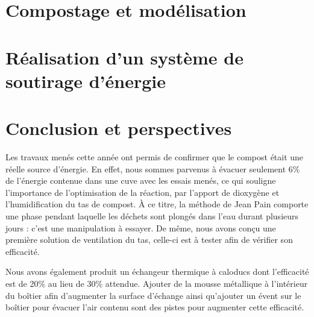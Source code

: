 \documentclass[a4paper,11pt,french]{article}
\begin{document}




\section{Compostage et modélisation}











\section{Réalisation d'un système de soutirage d'énergie}







\clearpage

\section{Conclusion et perspectives}

Les travaux menés cette année ont permis de confirmer que le compost était une réelle source d'énergie. En effet, nous sommes parvenus à évacuer seulement 6\% de l'énergie contenue dans une cuve avec les essais menés, ce qui souligne l'importance de l'optimisation de la réaction, par l'apport de dioxygène et l'humidification du tas de compost. À ce titre, la méthode de Jean Pain comporte une phase pendant laquelle les déchets sont plongés dans l'eau durant plusieurs jours : c'est une manipulation à essayer. De même, nous avons conçu une première solution de ventilation du tas, celle-ci est à tester afin de vérifier son efficacité.

Nous avons également produit un échangeur thermique à caloducs dont l'efficacité est  de 20\% au lieu de 30\% attendue. Ajouter de la mousse métallique à l'intérieur du boîtier afin d'augmenter la surface d'échange ainsi qu'ajouter un évent sur le boîtier pour évacuer l'air contenu sont des pistes pour augmenter cette efficacité.
\end{document}
